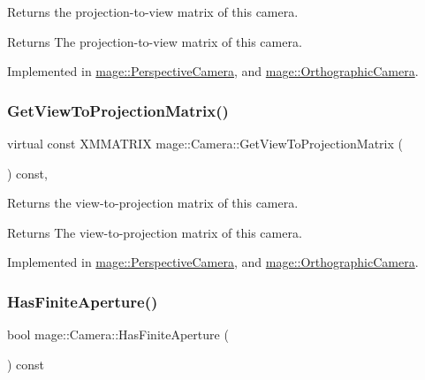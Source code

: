 Returns the projection-\/to-\/view matrix of this camera.

\begin{DoxyReturn}{Returns}
The projection-\/to-\/view matrix of this camera. 
\end{DoxyReturn}


Implemented in \hyperlink{classmage_1_1_perspective_camera_a18a73ab773e3cc50194f700a2f4e288e}{mage\+::\+Perspective\+Camera}, and \hyperlink{classmage_1_1_orthographic_camera_a9917199e789a06624219166f72b940f2}{mage\+::\+Orthographic\+Camera}.

\hypertarget{classmage_1_1_camera_ad3e8380ba9718a983f72d753d08f556e}{}\label{classmage_1_1_camera_ad3e8380ba9718a983f72d753d08f556e} 
\subsubsection{\texorpdfstring{Get\+View\+To\+Projection\+Matrix()}{GetViewToProjectionMatrix()}}
{\footnotesize\ttfamily virtual const X\+M\+M\+A\+T\+R\+IX mage\+::\+Camera\+::\+Get\+View\+To\+Projection\+Matrix (\begin{DoxyParamCaption}{ }\end{DoxyParamCaption}) const\hspace{0.3cm}{\ttfamily [pure virtual]}, {\ttfamily [noexcept]}}

Returns the view-\/to-\/projection matrix of this camera.

\begin{DoxyReturn}{Returns}
The view-\/to-\/projection matrix of this camera. 
\end{DoxyReturn}


Implemented in \hyperlink{classmage_1_1_perspective_camera_a5b733ac978a22dc58b04cf301899d575}{mage\+::\+Perspective\+Camera}, and \hyperlink{classmage_1_1_orthographic_camera_a1e8ea42a5df6dab1163b2c3938480f7c}{mage\+::\+Orthographic\+Camera}.

\hypertarget{classmage_1_1_camera_a414cfe9e97f0e42364056e78412fef1a}{}\label{classmage_1_1_camera_a414cfe9e97f0e42364056e78412fef1a} 
\subsubsection{\texorpdfstring{Has\+Finite\+Aperture()}{HasFiniteAperture()}}
{\footnotesize\ttfamily bool mage\+::\+Camera\+::\+Has\+Finite\+Aperture (\begin{DoxyParamCaption}{ }\end{DoxyParamCaption}) const\hspace{0.3cm}{\ttfamily [noexcept]}}


